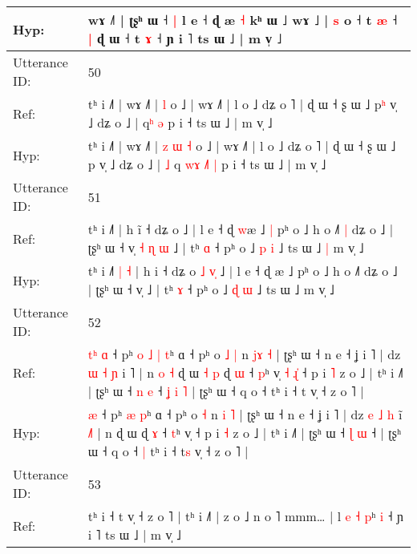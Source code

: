 \documentclass[10pt]{article}
\DeclareRobustCommand{\hl}[1]{{\textcolor{red}{#1}}}
\begin{document}
\begin{longtable}{ll}
 \\
Hyp: & wɤ ˩˥ | ʈʂʰ ɯ ˧\hl{ }\hl{|} l e ˧ ɖ \hl{}æ \hl{˧} kʰ ɯ ˩\hl{}\hl{} wɤ ˩\hl{} | \hl{s} o ˧ t \hl{æ} ˧\hl{ }\hl{|} ɖ ɯ ˧ t \hl{ɤ} ˧ ɲ i ˥ ts ɯ ˩ | m v̩ ˩
 \\
\midrule
Utterance ID: & 50 \\
Ref: & tʰ i ˩˥ | wɤ ˩˥ |\hl{}\hl{}\hl{}\hl{} \hl{l} o ˩ | wɤ ˩˥ | l o ˩ dʑ o ˥ | ɖ ɯ ˧ ʂ ɯ ˩ p\hl{ʰ} v̩ ˩ dʑ o ˩ |\hl{}\hl{} q\hl{}\hl{}\hl{}\hl{}\hl{}\hl{ʰ} \hl{ə} p i ˧ ts ɯ ˩ | m v̩ ˩
 \\
Hyp: & tʰ i ˩˥ | wɤ ˩˥ |\hl{ }\hl{z}\hl{ }\hl{ɯ} \hl{˧} o ˩ | wɤ ˩˥ | l o ˩ dʑ o ˥ | ɖ ɯ ˧ ʂ ɯ ˩ p\hl{} v̩ ˩ dʑ o ˩ |\hl{ }\hl{˩} q\hl{ }\hl{w}\hl{ɤ}\hl{ }\hl{˩}\hl{˥} \hl{|} p i ˧ ts ɯ ˩ | m v̩ ˩
 \\
\midrule
Utterance ID: & 51 \\
Ref: & tʰ i ˩˥\hl{}\hl{}\hl{}\hl{} | h i\hl{̃} ˧ dʑ o\hl{}\hl{}\hl{}\hl{}\hl{} ˩ | l e ˧ ɖ \hl{w}æ ˩\hl{ }\hl{|} pʰ o ˩ h o ˩˥\hl{ }\hl{|} dʑ o ˩ | ʈʂʰ ɯ ˧ v̩\hl{ }\hl{˧}\hl{ }\hl{ɳ}\hl{ }\hl{ɯ} ˩ | tʰ \hl{ɑ} ˧ pʰ o ˩ \hl{p} \hl{i} ˩ ts ɯ ˩\hl{ }\hl{|} m v̩ ˩
 \\
Hyp: & tʰ i ˩˥\hl{ }\hl{|}\hl{ }\hl{˧} | h i\hl{} ˧ dʑ o\hl{ }\hl{˩}\hl{ }\hl{v}\hl{̩} ˩ | l e ˧ ɖ \hl{}æ ˩\hl{}\hl{} pʰ o ˩ h o ˩˥\hl{}\hl{} dʑ o ˩ | ʈʂʰ ɯ ˧ v̩\hl{}\hl{}\hl{}\hl{}\hl{}\hl{} ˩ | tʰ \hl{ɤ} ˧ pʰ o ˩ \hl{ɖ} \hl{ɯ} ˩ ts ɯ ˩\hl{}\hl{} m v̩ ˩
 \\
\midrule
Utterance ID: & 52 \\
Ref: & \hl{t}\hl{ʰ}\hl{ }\hl{ɑ} ˧ pʰ\hl{ }\hl{o}\hl{ }\hl{˩} \hl{|} \hl{t}ʰ ɑ ˧ pʰ o\hl{ }\hl{˩} \hl{|} n \hl{j}\hl{ɤ} \hl{˧} | ʈʂʰ ɯ ˧ n e ˧ ʝ i ˥ | dz \hl{ɯ} \hl{˧} \hl{ɲ} i\hl{} \hl{}˥ | n\hl{ }\hl{o}\hl{ }\hl{˧} ɖ ɯ\hl{ }\hl{˧}\hl{ }\hl{p} ɖ \hl{ɯ} ˧ \hl{p}ʰ v̩\hl{ }\hl{˧}\hl{ }\hl{ɻ}\hl{̍} ˧ p i \hl{˥} z o ˩ | tʰ i ˩˥ | ʈʂʰ ɯ ˧ \hl{n} \hl{e} ˧\hl{ }\hl{ʝ}\hl{ }\hl{i}\hl{ }\hl{˥} | ʈʂʰ ɯ ˧ q o ˧\hl{}\hl{} tʰ i ˧ t\hl{} v̩ ˧ z o ˥ |
 \\
Hyp: & \hl{}\hl{}\hl{}\hl{æ} ˧ pʰ\hl{}\hl{}\hl{}\hl{} \hl{æ} \hl{p}ʰ ɑ ˧ pʰ o\hl{}\hl{} \hl{˧} n \hl{}\hl{i} \hl{˥} | ʈʂʰ ɯ ˧ n e ˧ ʝ i ˥ | dz \hl{e} \hl{˩} \hl{h} i\hl{̃} \hl{˩}˥ | n\hl{}\hl{}\hl{}\hl{} ɖ ɯ\hl{}\hl{}\hl{}\hl{} ɖ \hl{ɤ} ˧ \hl{t}ʰ v̩\hl{}\hl{}\hl{}\hl{}\hl{} ˧ p i \hl{˧} z o ˩ | tʰ i ˩˥ | ʈʂʰ ɯ ˧ \hl{ɭ} \hl{ɯ} ˧\hl{}\hl{}\hl{}\hl{}\hl{}\hl{} | ʈʂʰ ɯ ˧ q o ˧\hl{ }\hl{|} tʰ i ˧ t\hl{s} v̩ ˧ z o ˥ |
 \\
\midrule
Utterance ID: & 53 \\
Ref: & tʰ i ˧ t v̩ ˧ z o ˥ | tʰ i ˩˥ | z o ˩ n o ˥\hl{}\hl{} mmm… | l \hl{e} \hl{˧} \hl{p}ʰ \hl{i} ˧ ɲ i ˥ ts ɯ ˩ | m v̩ ˩\hl{}\hl{}

\end{longtable}
\end{document}
